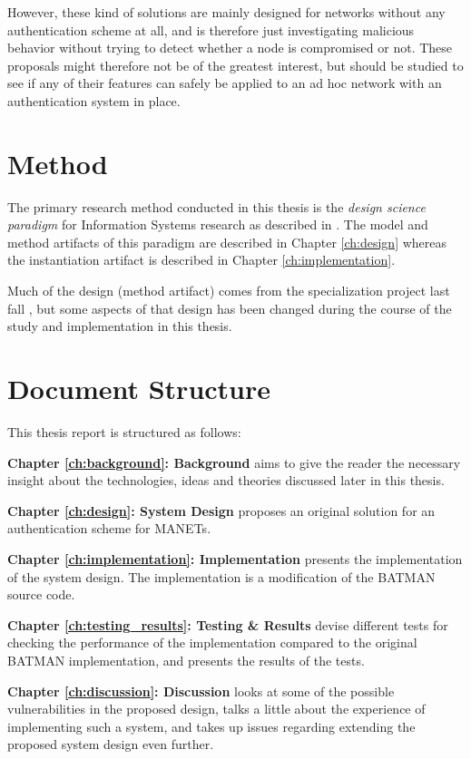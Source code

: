 However, these kind of solutions are mainly designed for networks without any
authentication scheme at all, and is therefore just investigating malicious
behavior without trying to detect whether a node is compromised or not. These
proposals might therefore not be of the greatest interest, but should be studied
to see if any of their features can safely be applied to an ad hoc network with
an authentication system in place.

\section{Method}
The primary research method conducted in this thesis is the \emph{design
science paradigm} for Information Systems research as described in
\cite{hevner2003information}. The model and method artifacts of this paradigm
are described in Chapter \ref{ch:design} whereas the instantiation artifact is
described in Chapter \ref{ch:implementation}.

Much of the design (method artifact) comes from the specialization project last
fall \cite{bowitz_graarud}, but some aspects of that design has been changed
during the course of the study and implementation in this thesis.

\section{Document Structure}
This thesis report is structured as follows:

\textbf{Chapter \ref{ch:background}: Background} aims to give the reader the
necessary insight about the technologies, ideas and theories discussed later in
this thesis.

\textbf{Chapter \ref{ch:design}: System Design} proposes an original solution
for an authentication scheme for \acp{MANET}.

\textbf{Chapter \ref{ch:implementation}: Implementation} presents the
implementation of the system design. The implementation is a modification of the
\ac{BATMAN} source code.

\textbf{Chapter \ref{ch:testing_results}: Testing \& Results} devise different
tests for checking the performance of the implementation compared to the
original \ac{BATMAN} implementation, and presents the results of the tests.

\textbf{Chapter \ref{ch:discussion}: Discussion} looks at some of the possible
vulnerabilities in the proposed design, talks a little about the experience of
implementing such a system, and takes up issues regarding extending the proposed
system design even further.

